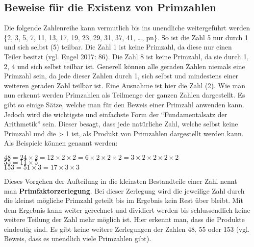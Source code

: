 \documentclass[german,12pt,a4paper]{article}
\begin{document}
\subsection{Beweise für die Existenz von Primzahlen}\label{Beweise für die Existenz von Primzahlen}
Die folgende Zahlenreihe kann vermutlich bis ins unendliche weitergeführt werden \{2, 3, 5, 7, 11, 13, 17, 19, 23, 29, 31, 37, 41, …, pn\}.
So ist die Zahl 5 nur durch 1 und sich selbst (5) teilbar.
Die Zahl 1 ist keine Primzahl, da diese nur einen Teiler besitzt (vgl. Engel 2017: 86).
Die Zahl 8 ist keine Primzahl, da sie durch 1, 2, 4 und sich selbst teilbar ist.
Generell können alle geraden Zahlen niemals eine Primzahl sein, da jede dieser Zahlen durch 1, sich selbst und mindestens einer weiteren geraden Zahl teilbar ist.
Eine Ausnahme ist hier die Zahl (2).
Wie man nun erkennt werden Primzahlen als Teilmenge der ganzen Zahlen dargestellt.
Es gibt so einige Sätze, welche man für den Beweis einer Primzahl anwenden kann.
Jedoch wird die wichtigste und einfachste Form der “Fundamentalsatz der Arithmetik” sein.
Dieser besagt, dass jede natürliche Zahl, welche selbst keine Primzahl und die > 1 ist, als Produkt von Primzahlen dargestellt werden kann.
Als Beispiele können genannt werden:\
\begin{center}$48 = 24\times{2} = 12\times{2}\times{2} = 6\times{2}\times{2}\times{2} = 3\times{2}\times{2}\times{2}\times{2}$\\
$55 = 11\times5$\\
$153 = 51\times{3} = 17\times{3}\times{3}$\end{center}
Dieses Vorgehen der Aufteilung in die kleinsten Bestandteile einer Zahl nennt man \textbf{Primfaktorzerlegung}\label{Primfaktorzerlegung}.
Bei dieser Zerlegung wird die jeweilige Zahl durch die kleinst mögliche Primzahl geteilt bis im Ergebnis kein Rest über bleibt.
Mit dem Ergebnis kann weiter gerechnet und dividiert werden bis schlussendlich keine weitere Teilung der Zahl mehr möglich ist.
Hier erkennt man, dass die Produkte eindeutig sind.
Es gibt keine weitere Zerlegungen der Zahlen 48, 55 oder 153 (vgl. Beweis, dass es unendlich viele Primzahlen gibt). 
\end{document}

